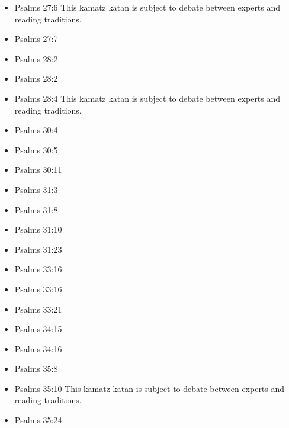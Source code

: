 \documentclass[14pt]{article}
\begin{document}
\begin{multicols}{2}
\begin{itemize}
\item Psalms 27:6 This kamatz katan is subject to debate between experts and reading traditions.

\item Psalms 27:7

\item Psalms 28:2

\item Psalms 28:2

\item Psalms 28:4 This kamatz katan is subject to debate between experts and reading traditions.

\item Psalms 30:4

\item Psalms 30:5

\item Psalms 30:11

\item Psalms 31:3

\item Psalms 31:8

\item Psalms 31:10

\item Psalms 31:23


\item Psalms 33:16

\item Psalms 33:16

\item Psalms 33:21

\item Psalms 34:15

\item Psalms 34:16


\item Psalms 35:8

\item Psalms 35:10 This kamatz katan is subject to debate between experts and reading traditions.

\item Psalms 35:24


\end{itemize}
\end{multicols}
\end{document}
